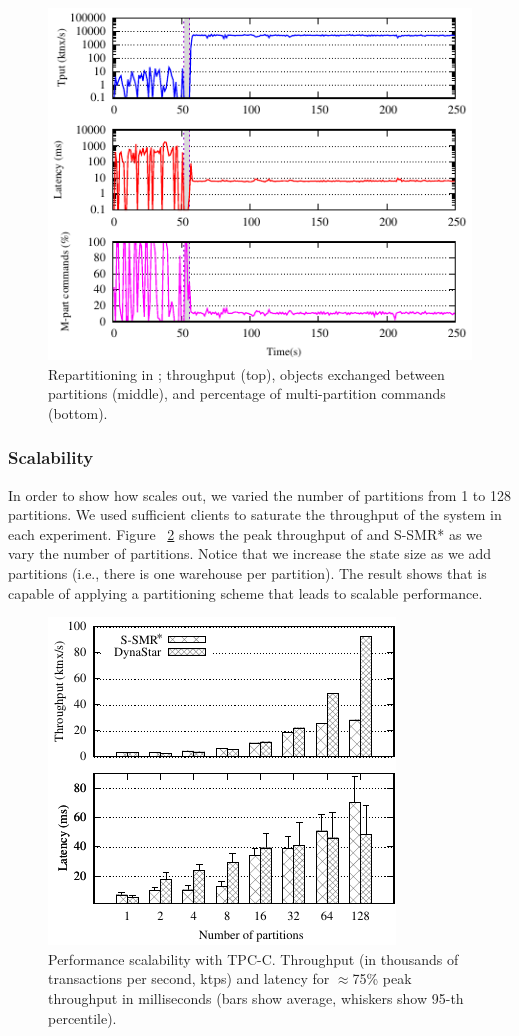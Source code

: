 \begin{figure}[ht!]
  \centering
    \includegraphics[width=0.8\columnwidth]{figures/experiments/dynastar/tpcc-detail-dynastar}
  \caption{Repartitioning in \dynastar; throughput (top), objects exchanged between partitions (middle),
  and percentage of multi-partition commands (bottom).}
  \label{fig:tpcc_repartitioning}
\end{figure}

\subsubsection{Scalability}
In order to show how \dynastar scales out, we varied the number of partitions
from 1 to 128 partitions. We used sufficient clients to  saturate the throughput
of the system in each experiment. Figure ~\ref{fig:tpcc_scaling} shows the peak
throughput of \dynastar and S-SMR* as we vary the number of partitions. Notice
that we increase the state size as we add partitions (i.e., there is one
warehouse per partition). The result shows that \dynastar is capable of applying
a partitioning scheme that leads to scalable performance.

\begin{figure}[ht!]
  \centering
    \includegraphics[width=0.7\columnwidth]{figures/experiments/dynastar/tpcc-scaling-tp-lat.pdf}
  \caption{Performance scalability with TPC-C. Throughput (in thousands of transactions per second, ktps) and latency for $\approx$75\% peak throughput in milliseconds (bars show average, whiskers show 95-th percentile).}
  \label{fig:tpcc_scaling}
\end{figure}

